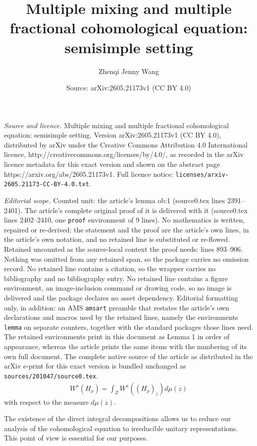 \documentclass[10pt,a4paper]{amsart}
\title{Multiple mixing and multiple fractional cohomological equation: semisimple setting}
\author{Zhenqi Jenny Wang}
\date{Source: arXiv:2605.21173v1 (CC BY 4.0)}
\begin{document}
\maketitle

\noindent\emph{Source and licence.} Multiple mixing and multiple fractional cohomological equation: semisimple setting. Version arXiv:2605.21173v1 (CC BY 4.0), distributed by arXiv under the Creative Commons Attribution 4.0 International licence, http://creativecommons.org/licenses/by/4.0/, as recorded in the arXiv licence metadata for this exact version and shown on the abstract page https://arxiv.org/abs/2605.21173v1. Full licence notice: \texttt{licenses/arxiv-2605.21173-CC-BY-4.0.txt}.\par\smallskip

\noindent\textit{Editorial scope.} Counted unit: the article's lemma ob:1 (source0.tex lines 2391--2401). The article's complete original proof of it is delivered with it (source0.tex lines 2402--2410, one \texttt{proof} environment of 9 lines). No mathematics is written, repaired or re-derived: the statement and the proof are the article's own lines, in the article's own notation, and no retained line is substituted or re-flowed.  Retained uncounted as the source-local context the proof needs: lines 893--906.  Nothing was omitted from any retained span, so the package carries no omission record.  No retained line contains a citation, so the wrapper carries no bibliography and no bibliography entry.  No retained line contains a figure environment, an image-inclusion command or drawing code, so no image is delivered and the package declares no asset dependency.  Editorial formatting only, in addition: an AMS \texttt{amsart} preamble that restates the article's own declarations and macros used by the retained lines, namely the environments \texttt{lemma} on separate counters, together with the standard packages those lines need.  The retained environments print in this document as Lemma 1 in order of appearance, whereas the article prints the same items with the numbering of its own full document.  The complete native source of the article as distributed in the arXiv e-print for this exact version is bundled unchanged as \texttt{sources/201047/source0.tex}.
\begin{align*}
 W^s(H_\rho)=\int_Z W^s((H_\rho)_z)d\mu(z)
\end{align*}
with respect to the measure $d\mu(z)$.

The existence of the direct integral decompositions allows us to reduce our analysis of the
cohomological equation to irreducible unitary representations. This point of view is
essential for our purposes.
\end{document}
